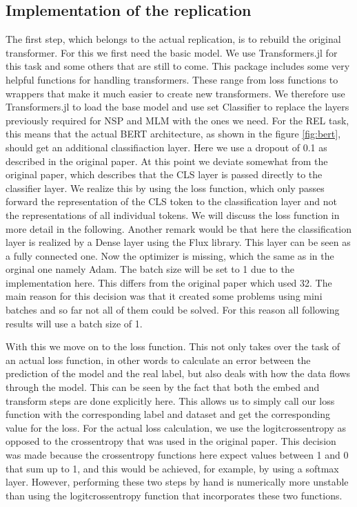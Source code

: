 \subsection{Implementation of the replication}
The first step, which belongs to the actual replication, is to rebuild the original transformer. For this we first need the basic model. We use Transformers.jl\cite{Cheng2020} for this task and some others that are still to come. This package includes some very helpful functions for handling transformers. These range from loss functions to wrappers that make it much easier to create new transformers. We therefore use Transformers.jl to load the base model and use set Classifier to replace the layers previously required for NSP and MLM with the ones we need. For the REL task, this means that the actual BERT architecture, as shown in the figure \ref{fig:bert}, should get an additional classifiaction layer. Here we use a dropout of 0.1 as described in the original paper. At this point we deviate somewhat from the original paper, which describes that the CLS layer is passed directly to the classifier layer.\cite{Beltagy2019} We realize this by using the loss function, which only passes forward the representation of the CLS token to the classification layer and not the representations of all individual tokens. We will discuss the loss function in more detail in the following. Another remark would be that here the classification layer is realized by a Dense layer using the Flux library. This layer can be seen as a fully connected one.  Now the optimizer is missing, which the same as in the orginal one namely Adam. The batch size will be set to 1 due to the implementation here. This differs from the original paper which used 32.\cite{Beltagy2019} The main reason for this decision was that it created some problems using mini batches and so far not all of them could be solved. For this reason all following results will use a batch size of 1. 

With this we move on to the loss function. This not only takes over the task of an actual loss function, in other words to calculate an error between the prediction of the model and the real label, but also deals with how the data flows through the model. This can be seen by the fact that both the embed and transform steps are done explicitly here. This allows us to simply call our loss function with the corresponding label and dataset and get the corresponding value for the loss. For the actual loss calculation, we use the logitcrossentropy as opposed to the crossentropy that was used in the original paper.\cite{Beltagy2019} This decision was made because the crossentropy functions here expect values between 1 and 0 that sum up to 1, and this would be achieved, for example, by using a softmax layer. However, performing these two steps by hand is numerically more unstable than using the logitcrossentropy function that incorporates these two functions. \cite{Flux.jl-2018,innes:2018}


